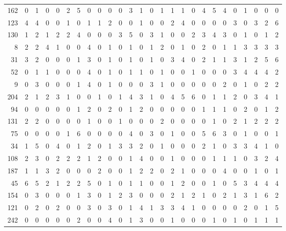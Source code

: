 \begin{longtable}{@{\extracolsep{\fill}}rccccccccccccccccccccccccc@{}}
162 & 0 & 1 & 0 & 0 & 2 & 5 & 0 & 0 & 0 & 0 & 3 & 1 & 0 & 1 & 1 & 1 & 0 & 4 & 5 & 4 & 0 & 1 & 0 & 0 & 0 \\
123 & 4 & 4 & 0 & 0 & 1 & 0 & 1 & 1 & 2 & 0 & 0 & 1 & 0 & 0 & 2 & 4 & 0 & 0 & 0 & 0 & 3 & 0 & 3 & 2 & 6 \\
130 & 1 & 2 & 1 & 2 & 2 & 4 & 0 & 0 & 0 & 3 & 5 & 0 & 3 & 1 & 0 & 0 & 2 & 3 & 4 & 3 & 0 & 1 & 0 & 1 & 2 \\
8 & 2 & 2 & 4 & 1 & 0 & 0 & 4 & 0 & 1 & 0 & 1 & 0 & 1 & 2 & 0 & 1 & 0 & 2 & 0 & 1 & 1 & 3 & 3 & 3 & 3 \\
31 & 3 & 2 & 0 & 0 & 0 & 1 & 3 & 0 & 1 & 0 & 1 & 0 & 1 & 0 & 3 & 4 & 0 & 2 & 1 & 1 & 3 & 1 & 2 & 5 & 6 \\
52 & 0 & 1 & 1 & 0 & 0 & 0 & 4 & 0 & 1 & 0 & 1 & 1 & 0 & 1 & 0 & 0 & 1 & 0 & 0 & 0 & 3 & 4 & 4 & 4 & 2 \\
9 & 0 & 3 & 0 & 0 & 0 & 1 & 4 & 0 & 1 & 0 & 0 & 0 & 3 & 1 & 0 & 0 & 0 & 0 & 0 & 2 & 0 & 1 & 0 & 2 & 2 \\
204 & 2 & 1 & 2 & 3 & 1 & 0 & 0 & 1 & 0 & 1 & 4 & 3 & 1 & 0 & 4 & 5 & 6 & 0 & 1 & 1 & 2 & 0 & 3 & 4 & 1 \\
94 & 0 & 0 & 0 & 0 & 0 & 1 & 2 & 0 & 2 & 0 & 1 & 2 & 0 & 0 & 0 & 0 & 0 & 1 & 1 & 1 & 0 & 2 & 0 & 1 & 2 \\
131 & 2 & 2 & 0 & 0 & 0 & 0 & 1 & 0 & 0 & 1 & 0 & 0 & 0 & 2 & 0 & 0 & 0 & 0 & 1 & 0 & 2 & 1 & 2 & 2 & 2 \\
75 & 0 & 0 & 0 & 0 & 1 & 6 & 0 & 0 & 0 & 0 & 4 & 0 & 3 & 0 & 1 & 0 & 0 & 5 & 6 & 3 & 0 & 1 & 0 & 0 & 1 \\
34 & 1 & 5 & 0 & 4 & 0 & 1 & 2 & 0 & 1 & 3 & 3 & 2 & 0 & 1 & 0 & 0 & 0 & 2 & 1 & 0 & 3 & 3 & 4 & 1 & 0 \\
108 & 2 & 3 & 0 & 2 & 2 & 2 & 1 & 2 & 0 & 0 & 1 & 4 & 0 & 0 & 1 & 0 & 0 & 0 & 1 & 1 & 1 & 0 & 3 & 2 & 4 \\
187 & 1 & 1 & 3 & 2 & 0 & 0 & 0 & 2 & 0 & 0 & 1 & 2 & 2 & 0 & 2 & 1 & 0 & 0 & 0 & 4 & 0 & 0 & 1 & 0 & 1 \\
45 & 6 & 5 & 2 & 1 & 2 & 2 & 5 & 0 & 1 & 0 & 1 & 1 & 0 & 0 & 1 & 2 & 0 & 0 & 1 & 0 & 5 & 3 & 4 & 4 & 4 \\
154 & 0 & 3 & 0 & 0 & 0 & 1 & 3 & 0 & 1 & 2 & 3 & 0 & 0 & 0 & 2 & 1 & 2 & 1 & 0 & 2 & 1 & 3 & 1 & 6 & 2 \\
121 & 0 & 2 & 0 & 2 & 0 & 0 & 3 & 0 & 3 & 0 & 1 & 4 & 1 & 3 & 3 & 4 & 1 & 0 & 0 & 0 & 0 & 2 & 0 & 1 & 5 \\
242 & 0 & 0 & 0 & 0 & 0 & 2 & 0 & 0 & 4 & 0 & 1 & 3 & 0 & 0 & 1 & 0 & 0 & 0 & 1 & 0 & 1 & 0 & 1 & 1 & 1 \\

\end{longtable}

